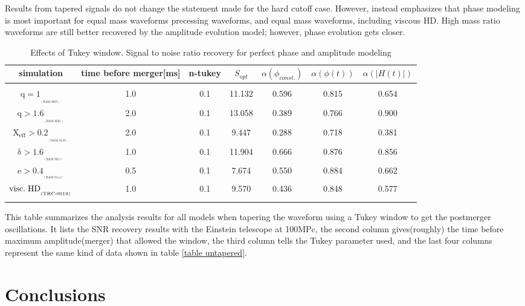 Results from tapered signals do not change the statement made for the hard cutoff case. However, instead emphasizes that phase modeling is most important for equal mass waveforms precessing waveforms, and equal mass waveforms, including viscous HD. High mass ratio waveforms are still better recovered by the amplitude evolution model; however, phase evolution gets closer.


\begin{table}[!htbp]
\begin{center}

\begin{tabular}{ccccccc}
simulation&time before merger[ms]&n-tukey&$S_{opt}$&$\alpha(\phi_{const.})$&$\alpha(\phi(t))$&$\alpha(|H(t)|)$\\ 
\hline\\ 
$\mathrm{{q=1}_{_{_{(BAM:0035)}}}}$&1.0&0.1&11.132&0.596&0.815&0.654\\  
$\mathrm{{q>1.6}_{_{_{(BAM:0021)}}}}$&2.0&0.1&13.058&0.389&0.766&0.900\\  
$\mathrm{{X_{eff}>0.2}_{_{_{(BAM:0110)}}}}$&2.0&0.1&9.447&0.288&0.718&0.381\\  
$\mathrm{{\delta>1.6}_{_{_{(BAM:0011)}}}}$&1.0&0.1&11.904&0.666&0.876&0.856\\  
$\mathrm{{e>0.4}_{_{_{(BAM:0114)}}}}$&0.5&0.1&7.674&0.550&0.884&0.662\\  
$\mathrm{{visc.\hspace{1mm} HD}_{_{_{(THC:0019)}}}}$&1.0&0.1&9.570&0.436&0.848&0.577\\  
\hline\\ 
\end{tabular}

\end{center}
\caption{Effects of Tukey window. Signal to noise ratio recovery for perfect phase and amplitude modeling}
This table summarizes the analysis results for all models when tapering the waveform using a Tukey window to get the postmerger oscillations. It lists the  SNR  recovery results with the Einstein telescope at 100MPc, the second column gives(roughly) the time before maximum amplitude(merger) that allowed the window,  the third column tells the Tukey parameter used, and the last four columns represent the same kind of data shown in table \ref{table untapered}.
\end{table}
\FloatBarrier

\newpage
{}

\chapter*{Conclusions}

